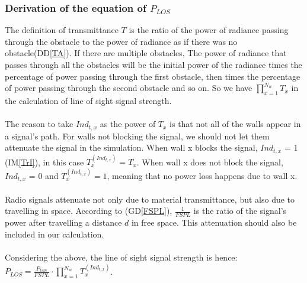 \documentclass[12pt]{article}
\newcommand{\dref}[1]{GD\ref{#1}}
\newcommand{\ddref}[1]{DD\ref{#1}}
\newcommand{\iref}[1]{IM\ref{#1}}
\begin{document}
\subsubsection*{Derivation of the equation of $P_{LOS}$}

The definition of transmittance $T$ is the ratio of the power of radiance passing 
through the obstacle to the power of radiance as if there was no obstacle(\ddref{TA}).
If there are multiple obstacles, The power of radiance that passes through all the
obstacles will be the initial power of the radiance times the percentage of power 
passing through the first obstacle, then times the percentage of power 
passing through the second obstacle and so on. So we have $\prod_{x=1}^{N_w}T_x$ in 
the calculation of line of sight signal strength.\\
\\
The reason to take $Ind_{t,x}$ as the power of $T_x$ is that not all of the walls 
appear in a signal's path. For walls not blocking the signal, we should not let them
attenuate the signal in the simulation. When wall x blocks the signal, $Ind_{t,x}$ 
= 1 (\iref{TrI}), in this case $T_x^{(Ind_{t,x})} = T_x$. When wall x does
not block the signal, $Ind_{t,x}$ = 0 and $T_x^{(Ind_{t,x})} = 1$, meaning that no
power loss happens due to wall x.\\
\\
Radio signals attenuate not only due to material transmittance, but also due to travelling in space. According to (\dref{FSPL}), $\frac{1}{FSPL}$ is the ratio of the signal's power after travelling a distance $d$ in free space. This attenuation should also be included
in our calculation.\\
\\
Considering the above, the line of sight signal strength is hence:\\ 
\indent
$P_{LOS} = \frac{P_{tsm}}{FSPL}\cdot \prod_{x=1}^{N_w}T_x^{(Ind_{t,x})}$.
 
\end{document}
